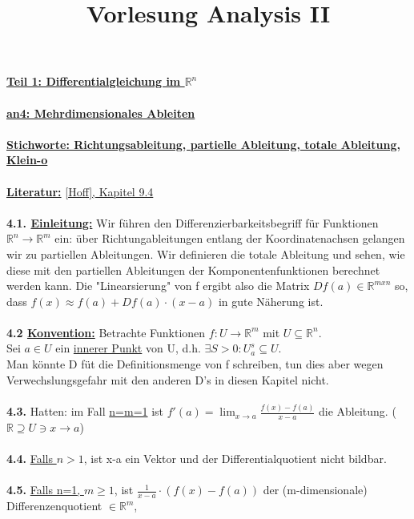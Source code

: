 \documentclass[]{scrartcl}
\title{Vorlesung Analysis II}
\begin{document}
	\maketitle
	\textbf{\underline{Teil 1: Differentialgleichung im $\mathbb{R}^n$}}\\
	\\
	\textbf{\underline{an4: Mehrdimensionales Ableiten}}\\
	\\
	\textbf{\underline{\underline{Stichworte:} Richtungsableitung, partielle Ableitung, totale Ableitung, Klein-o}}\\
	\\
	\textbf{\underline{Literatur:}} \ul{[Hoff], Kapitel 9.4}\\
	\\
	\textbf{4.1. \underline{Einleitung:}} Wir führen den 
	Differenzierbarkeitsbegriff  für Funktionen 
	$\mathbb{R}^n\rightarrow\mathbb{R}^m$ ein: über Richtungableitungen entlang 
	der Koordinatenachsen gelangen wir zu partiellen Ableitungen. Wir 
	definieren die totale Ableitung und sehen, wie diese mit den partiellen 
	Ableitungen der Komponentenfunktionen berechnet werden kann. Die 
	"Linearsierung" von f ergibt also die Matrix $Df(a)\in\mathbb{R}^{m x n}$ 
	so, dass $f(x) \approx f(a)+Df(a)\cdot(x-a)$ in gute Näherung ist.\\
	\\
	\textbf{4.2 \underline{Konvention:}} Betrachte Funktionen $f:U\rightarrow\mathbb{R}^m$ mit $U \subseteq \mathbb{R}^n$.\\
	Sei $a \in U$ ein \ul{innerer Punkt} von U, d.h. $\exists S 
	> 0: U_a^s\subseteq U.$\\
	Man könnte D füt die Definitionsmenge von f schreiben, tun dies aber wegen Verwechslungsgefahr mit den anderen D's in diesen Kapitel nicht.\\
	\\
	\textbf{4.3.} Hatten: im Fall \underline{n=m=1} ist $f'(a)=\lim_{x\rightarrow a}\frac{f(x)-f(a)}{x-a}$ die Ableitung.  ($\mathbb{R}\supseteq U \ni x \rightarrow a$)\\
	\\
	\textbf{4.4.} \underline{Falls $n>1$}, ist x-a ein Vektor und der Differentialquotient nicht bildbar.\\
	\\
	\textbf{4.5.} \underline{Falls n=1, $m\geq 1$}, ist $\frac{1}{x-a} \cdot 
	(f(x)-f(a))$ der (m-dimensionale) Differenzenquotient \underline{$\in 
	\mathbb{R}^m$},\\
\end{document}
